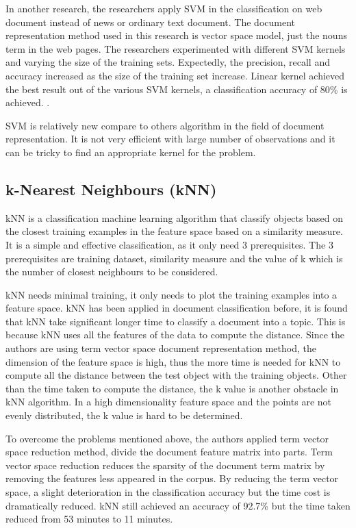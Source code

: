In another research, the researchers apply SVM in the classification on web document instead of news or ordinary text document. The document representation method used in this research is vector space model, just the nouns term in the web pages. The researchers experimented with different SVM kernels and varying the size of the training sets. Expectedly, the precision, recall and accuracy increased as the size of the training set increase. Linear kernel achieved the best result out of the various SVM kernels, a classification accuracy of 80\% is achieved. \cite{webSvm}.
	
SVM is relatively new compare to others algorithm in the field of document representation. It is not very efficient with large number of observations and it can be tricky to find an appropriate kernel for the problem. 
	
\subsection{k-Nearest Neighbours (kNN)}
kNN is a classification machine learning algorithm that classify objects based on the closest training examples in the feature space based on a similarity measure. It is a simple and effective classification, as it only need 3 prerequisites. The 3 prerequisites are training dataset, similarity measure and the value of k which is the number of closest neighbours to be considered. 
	
kNN needs minimal training, it only needs to plot the training examples into a feature space.  
kNN has been applied in document classification before, it is found that kNN take significant 
longer time to classify a document into a topic. This is because kNN uses all the features of the data to compute the distance. Since the authors are using term vector space document 
representation method, the dimension of the feature space is high, thus the more time is needed for kNN to compute all the distance between the test object with the training objects. Other than the time taken to compute the distance, the k value is another obstacle in kNN algorithm. In a high dimensionality feature space and the points are not evenly distributed, the k value is hard to be determined.
	
To overcome the problems mentioned above, the authors applied term vector space reduction method, divide the document feature matrix into parts. Term vector space reduction reduces 
the sparsity of the document term matrix by removing the features less appeared in the corpus. By reducing the term vector space, a slight deterioration in the classification accuracy but the time cost is dramatically reduced. kNN still achieved an accuracy of 92.7\% but the time taken reduced from 53 minutes to 11 minutes. \cite{knnVectorSpaceReduction}
	

